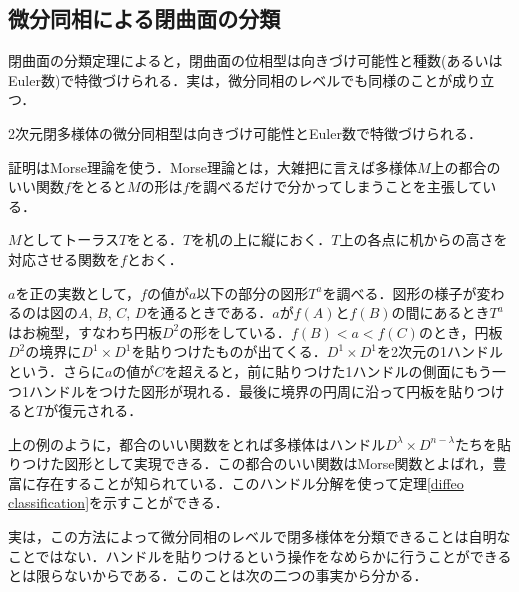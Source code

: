 \documentclass[dvipdfmx,uplatex]{jsarticle}
\begin{document}
\subsection{微分同相による閉曲面の分類}
閉曲面の分類定理によると，閉曲面の位相型は向きづけ可能性と種数(あるいはEuler数)で特徴づけられる．実は，微分同相のレベルでも同様のことが成り立つ．

\begin{theorem}\label{diffeo classification}
2次元閉多様体の微分同相型は向きづけ可能性とEuler数で特徴づけられる．
\end{theorem}

証明はMorse理論を使う．Morse理論とは，大雑把に言えば多様体$M$上の都合のいい関数$f$をとると$M$の形は$f$を調べるだけで分かってしまうことを主張している．

\begin{example}
$M$としてトーラス$T$をとる．$T$を机の上に縦におく．$T$上の各点に机からの高さを対応させる関数を$f$とおく．
\begin{center}
\end{center}

$a$を正の実数として，$f$の値が$a$以下の部分の図形$T^a$を調べる．図形の様子が変わるのは図の$A$, $B$, $C$, $D$を通るときである．$a$が$f(A)$と$f(B)$の間にあるとき$T^a$はお椀型，すなわち円板$D^2$の形をしている．$f(B)< a< f(C)$のとき，円板$D^2$の境界に$D^1\times D^1$を貼りつけたものが出てくる．$D^1\times D^1$を2次元の1ハンドルという．さらに$a$の値が$C$を超えると，前に貼りつけた1ハンドルの側面にもう一つ1ハンドルをつけた図形が現れる．最後に境界の円周に沿って円板を貼りつけると$T$が復元される．
\end{example}


上の例のように，都合のいい関数をとれば多様体はハンドル$D^\lambda\times D^{n-\lambda}$たちを貼りつけた図形として実現できる．この都合のいい関数はMorse関数とよばれ，豊富に存在することが知られている．このハンドル分解を使って定理\ref{diffeo classification}を示すことができる．

実は，この方法によって微分同相のレベルで閉多様体を分類できることは自明なことではない．ハンドルを貼りつけるという操作をなめらかに行うことができるとは限らないからである．このことは次の二つの事実から分かる．
\end{document}
